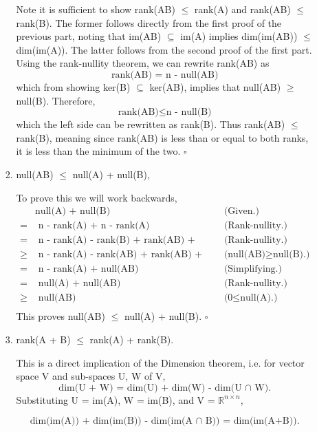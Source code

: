 \documentclass[12pt]{article}
\newcommand{\hop}{\vspace{1mm}}
\newcommand{\jump}{\vspace{5mm}}
\newcommand{\R}{\mathbb{R}}
\begin{document}
\begin{enumerate}[leftmargin=\labelsep]
\begin{enumerate}
\begin{enumerate}
        Note it is sufficient to show rank(AB) $\leq$ rank(A) and rank(AB) $\leq$ rank(B). The former follows directly from the first proof of the previous part, noting that im(AB) $\subseteq$ im(A) implies dim(im(AB)) $\leq$ dim(im(A)). The latter follows from the second proof of the first part. Using the rank-nullity theorem, we can rewrite rank(AB) as
        \[
        \text{rank(AB) = n - null(AB)}
        \]
        which from showing ker(B) $\subseteq$ ker(AB), implies that null(AB) $\geq$ null(B). Therefore,
        \[
        \text{rank(AB)} \leq \text{n - null(B)}
        \]
        which the left side can be rewritten as rank(B). Thus rank(AB) $\leq$ rank(B), meaning since rank(AB) is less than or equal to both ranks, it is less than the minimum of the two. $\square$
        \hop
        \item null(AB) $\leq$ null(A) + null(B), 
        \jump

        To prove this we will work backwards,
        \begin{align*}
        &\text{null(A) + null(B)} &\text{(Given.)}  \\
        =&\text{ n - rank(A) + n - rank(A)}  &\text{(Rank-nullity.)} \\
        =&\text{ n - rank(A) - rank(B) + rank(AB) + null(AB)} &\text{(Rank-nullity.)} \\
        \geq&\text{ n - rank(A) - rank(AB) + rank(AB) + null(AB)} &\text{(null(AB)} \geq \text{null(B).)}   \\
        =&\text{ n - rank(A) + null(AB)}    &\text{(Simplifying.)}  \\
        =&\text{ null(A) + null(AB)}    &\text{(Rank-nullity.)}    \\
        \geq&\text{ null(AB)}   &\text{(0} \leq \text{null(A).)} \\
        \end{align*}
        This proves null(AB) $\leq$ null(A) + null(B). $\square$
        \hop
        \item rank(A + B) $\leq$ rank(A) + rank(B).
        \jump

        This is a direct implication of the Dimension theorem, i.e. for vector space V and sub-spaces U, W of V, 
        \[
        \text{dim(U + W) = dim(U) + dim(W) - dim(U } \cap \text{ W).}
        \]
        Substituting U = im(A), W = im(B), and V = $\R^{n\times n}$,
        
        \[
        \text{dim(im(A)) + dim(im(B)) - dim(im(A } \cap \text{ B)) = dim(im(A+B)).}
        \]
        

\end{enumerate}
\end{enumerate}
\end{enumerate}
\end{document}
